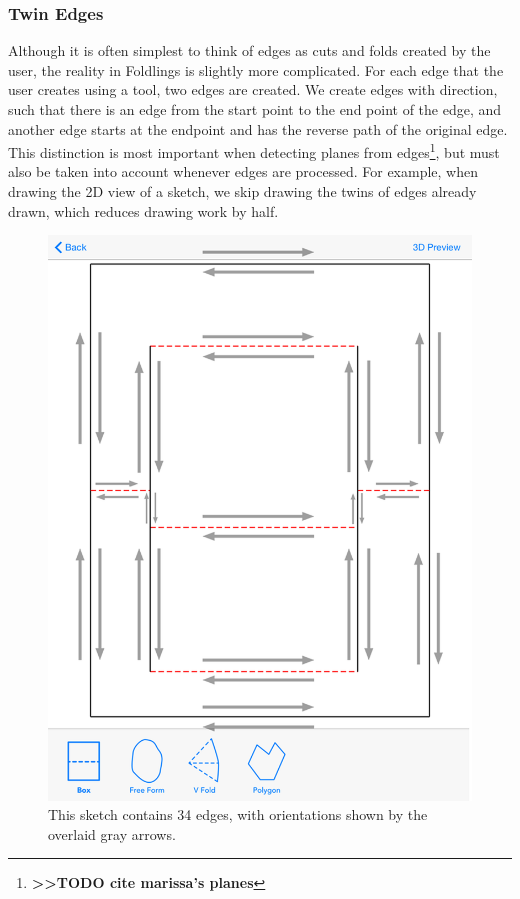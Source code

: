 \subsubsection{Twin Edges}\label{twin-edges}

Although it is often simplest to think of edges as cuts and folds
created by the user, the reality in Foldlings is slightly more
complicated. For each edge that the user creates using a tool, two edges
are created. We create edges with direction, such that there is an edge
from the start point to the end point of the edge, and another edge
starts at the endpoint and has the reverse path of the original edge.
This distinction is most important when detecting planes from
edges\footnote{\textbf{\textgreater{}\textgreater{}TODO cite marissa's
  planes}}, but must also be taken into account whenever edges are
processed. For example, when drawing the 2D view of a sketch, we skip
drawing the twins of edges already drawn, which reduces drawing work by
half.

\begin{figure}[htbp]
\centering
\includegraphics{figures/33_UI_Interface_Data_Structures/boxfold_34_edges.png}
\caption{This sketch contains 34 edges, with orientations shown by the
overlaid gray arrows.}
\end{figure}


